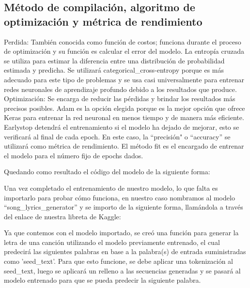 \documentclass[12pt, a4paper, titlepage]{report}
\begin{document}
\subsection{Método de compilación, algoritmo de optimización y métrica de rendimiento}
Perdida: También conocida como función de costos; funciona durante el proceso de optimización y su función es calcular el error del modelo. La entropía cruzada se utiliza para estimar la diferencia entre una distribución de probabilidad estimada y predicha. Se utilizará categorical\_cross-entropy porque es más adecuado para este tipo de problemas y se usa casi universalmente para entrenar redes neuronales de aprendizaje profundo debido a los resultados que produce.
Optimización: Se encarga de reducir las pérdidas y brindar los resultados más precisos posibles. Adam es la opción elegida porque es la mejor opción que ofrece Keras para entrenar la red neuronal en menos tiempo y de manera más eficiente. Earlystop detendrá el entrenamiento si el modelo ha dejado de mejorar, esto se verificará al final de cada epoch. En este caso, la ``precisión" o “accuracy” se utilizará como métrica de rendimiento.
El método fit es el encargado de entrenar el modelo para el número fijo de epochs dados.	
\begin{center}
	
\end{center}
Quedando como resultado el código del modelo de la siguiente forma:
\begin{center}
	
\end{center}
Una vez completado el entrenamiento de nuestro modelo, lo que falta es importarlo para probar cómo funciona, en nuestro caso nombramos al modelo “song\_lyrics\_generator” y se importo de la siguiente forma, llamándola a través del enlace de nuestra libreta de Kaggle:
\begin{center}
	
\end{center}
Ya que contemos con el modelo importado, se creó una función para generar la letra de una canción utilizando el modelo previamente entrenado, el cual predecirá las siguientes palabras en base a la palabra(s) de entrada suministradas como 'seed\_text'. Para que esto funcione, se debe aplicar una tokenización al seed\_text, luego se aplicará un relleno a las secuencias generadas y se pasará al modelo entrenado para que se pueda predecir la siguiente palabra.
\begin{center}
	
\end{center}	
\newpage
\end{document}
